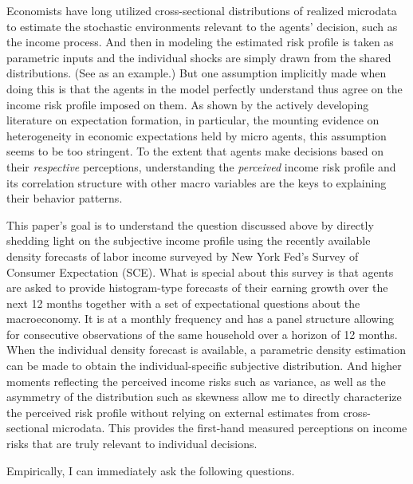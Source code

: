\documentclass[12pt,notitlepage,onecolumn,aps,pra]{article}
\begin{document}
Economists have long utilized cross-sectional distributions of realized
microdata to estimate the stochastic environments relevant to the
agents' decision, such as the income process. And then in modeling the
estimated risk profile is taken as parametric inputs and the individual
shocks are simply drawn from the shared distributions. (See
\cite{blundell_consumption_2008} as an example.) But one assumption
implicitly made when doing this is that the agents in the model
perfectly understand thus agree on the income risk profile imposed on
them. As shown by the actively developing literature on expectation
formation, in particular, the mounting evidence on heterogeneity in
economic expectations held by micro agents, this assumption seems to be
too stringent. To the extent that agents make decisions based on their
\emph{respective} perceptions, understanding the \emph{perceived} income
risk profile and its correlation structure with other macro variables
are the keys to explaining their behavior patterns.

This paper's goal is to understand the question discussed above by
directly shedding light on the subjective income profile using the
recently available density forecasts of labor income surveyed by New
York Fed's Survey of Consumer Expectation (SCE). What is special about
this survey is that agents are asked to provide histogram-type forecasts
of their earning growth over the next 12 months together with a set of
expectational questions about the macroeconomy. It is at a monthly
frequency and has a panel structure allowing for consecutive
observations of the same household over a horizon of 12 months. When the
individual density forecast is available, a parametric density
estimation can be made to obtain the individual-specific subjective
distribution. And higher moments reflecting the perceived income risks
such as variance, as well as the asymmetry of the distribution such as
skewness allow me to directly characterize the perceived risk profile
without relying on external estimates from cross-sectional microdata.
This provides the first-hand measured perceptions on income risks that
are truly relevant to individual decisions.

Empirically, I can immediately ask the following questions.
\end{document}
